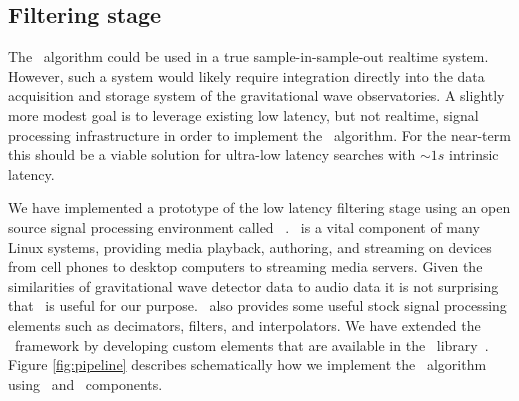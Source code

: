 \subsection{Filtering stage}

The \lloid\ algorithm could be used in a true sample-in-sample-out realtime
system.  However, such a system would likely require integration directly into
the data acquisition and storage system of the gravitational wave
observatories.  A slightly more modest goal is to leverage existing low
latency, but not realtime, signal processing infrastructure in order to
implement the \lloid\ algorithm.  For the near-term this should be a viable 
solution for ultra-low latency searches with $\sim 1s$ intrinsic latency.

We have implemented a prototype of the low latency filtering stage using an
open source signal processing environment called \gstreamer\ \cite{gstreamer}.
\gstreamer\ is a vital component of many Linux systems, providing media
playback, authoring, and streaming on devices from cell phones to desktop
computers to streaming media servers.  Given the similarities of gravitational
wave detector data to audio data it is not surprising that \gstreamer\ is
useful for our purpose. \gstreamer\ also provides some useful stock signal
processing elements such as decimators, filters, and interpolators.  
We have extended the \gstreamer\ framework by developing custom elements
that are available in the \gstlal\ library~\cite{gstlal}.
Figure \ref{fig:pipeline} describes schematically how we implement the \lloid\
algorithm using \gstlal\ and \gstreamer\ components.
%
%
